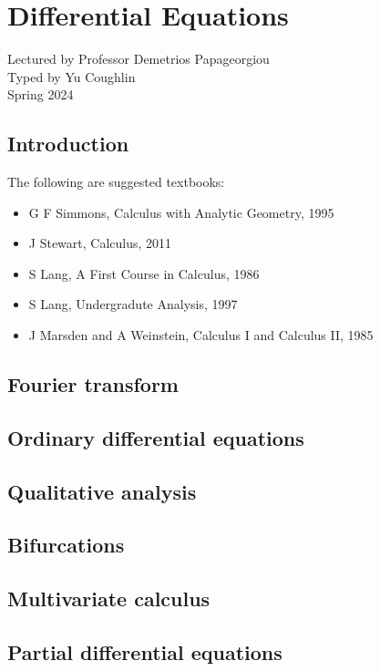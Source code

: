 \documentclass[../Year1/Year1.tex]{subfiles}
\begin{document}
\chapter{Differential Equations}
\renewcommand*\thesection{\arabic{section}}
Lectured by Professor Demetrios Papageorgiou \\ Typed by Yu Coughlin \\
Spring 2024

\section*{Introduction}


The following are suggested textbooks:
\begin{itemize}
    \item G F Simmons, Calculus with Analytic Geometry, 1995
    \item J Stewart, Calculus, 2011
    \item S Lang, A First Course in Calculus, 1986
    \item S Lang, Undergradute Analysis, 1997
    \item J Marsden and A Weinstein, Calculus I and Calculus II, 1985
\end{itemize}

\tableofcontents\pagebreak

\section{Fourier transform}
\section{Ordinary differential equations}
\section{Qualitative analysis}
\section{Bifurcations}
\section{Multivariate calculus}
\section{Partial differential equations}
\end{document}
